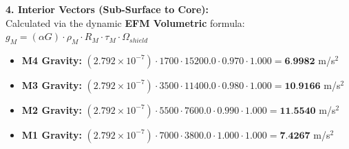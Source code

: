\documentclass[11pt, a4paper]{article}
\begin{document}
  \vspace{0.5em}
  \noindent \textbf{4. Interior Vectors (Sub-Surface to Core):} \\[0.5em]
  \hspace*{1em} Calculated via the dynamic \textbf{EFM Volumetric} formula: $g_M = (\alpha G) \cdot \rho_{M} \cdot R_M \cdot \tau_M \cdot \Omega_{shield}$
  \begin{itemize}
    \item \textbf{M4 Gravity:} $(2.792 \times 10^{-7}) \cdot 1700 \cdot 15200.0 \cdot 0.970 \cdot 1.000 = \textbf{6.9982}$ m/s$^2$
    \item \textbf{M3 Gravity:} $(2.792 \times 10^{-7}) \cdot 3500 \cdot 11400.0 \cdot 0.980 \cdot 1.000 = \textbf{10.9166}$ m/s$^2$
    \item \textbf{M2 Gravity:} $(2.792 \times 10^{-7}) \cdot 5500 \cdot 7600.0 \cdot 0.990 \cdot 1.000 = \textbf{11.5540}$ m/s$^2$
    \item \textbf{M1 Gravity:} $(2.792 \times 10^{-7}) \cdot 7000 \cdot 3800.0 \cdot 1.000 \cdot 1.000 = \textbf{7.4267}$ m/s$^2$
  \end{itemize}
\end{document}
